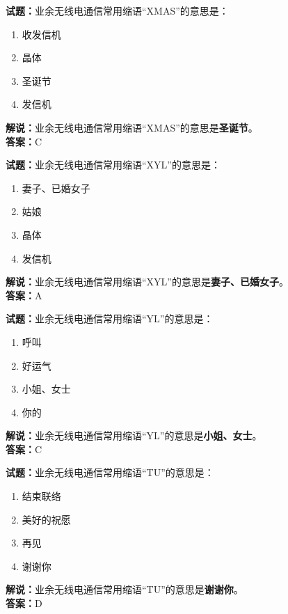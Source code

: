 \documentclass{ctexbook}
\begin{document}
\vspace{1em}

\textbf{试题：}业余无线电通信常用缩语“XMAS”的意思是：
\begin{enumerate}[leftmargin=3em]
  \item 收发信机
  \item 晶体
  \item 圣诞节
  \item 发信机
\end{enumerate}
\noindent\textbf{解说：}业余无线电通信常用缩语“XMAS”的意思是\textbf{圣诞节}。\\\noindent\textbf{答案：}C

\vspace{1em}

\textbf{试题：}业余无线电通信常用缩语“XYL”的意思是：
\begin{enumerate}[leftmargin=3em]
  \item 妻子、已婚女子
  \item 姑娘
  \item 晶体
  \item 发信机
\end{enumerate}
\noindent\textbf{解说：}业余无线电通信常用缩语“XYL”的意思是\textbf{妻子、已婚女子}。\\\noindent\textbf{答案：}A

\vspace{1em}

\textbf{试题：}业余无线电通信常用缩语“YL”的意思是：
\begin{enumerate}[leftmargin=3em]
  \item 呼叫
  \item 好运气
  \item 小姐、女士
  \item 你的
\end{enumerate}
\noindent\textbf{解说：}业余无线电通信常用缩语“YL”的意思是\textbf{小姐、女士}。\\\noindent\textbf{答案：}C

\vspace{1em}

\textbf{试题：}业余无线电通信常用缩语“TU”的意思是：
\begin{enumerate}[leftmargin=3em]
  \item 结束联络
  \item 美好的祝愿
  \item 再见
  \item 谢谢你
\end{enumerate}
\noindent\textbf{解说：}业余无线电通信常用缩语“TU”的意思是\textbf{谢谢你}。\\\noindent\textbf{答案：}D
\end{document}
